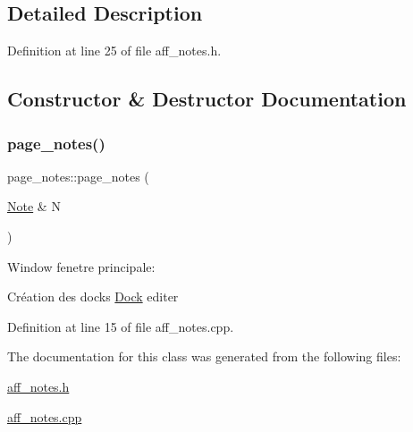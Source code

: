 \subsection{Detailed Description}


Definition at line 25 of file aff\+\_\+notes.\+h.



\subsection{Constructor \& Destructor Documentation}
\mbox{\label{classpage__notes_ad9a1b3dbe6c7901ed37a5784b1094fa6}} 
\subsubsection{\texorpdfstring{page\+\_\+notes()}{page\_notes()}}
{\footnotesize\ttfamily page\+\_\+notes\+::page\+\_\+notes (\begin{DoxyParamCaption}\item[{\hyperlink{class_note}{Note} \&}]{N }\end{DoxyParamCaption})}

Window fenetre principale\+:

Création des docks \hyperlink{class_dock}{Dock} editer

Definition at line 15 of file aff\+\_\+notes.\+cpp.



The documentation for this class was generated from the following files\+:\begin{DoxyCompactItemize}
\item 
\hyperlink{aff__notes_8h}{aff\+\_\+notes.\+h}\item 
\hyperlink{aff__notes_8cpp}{aff\+\_\+notes.\+cpp}\end{DoxyCompactItemize}
